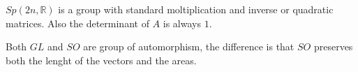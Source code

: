 \begin{Prp}
    $Sp(2n,\mathbb{R})$ is a group with standard moltiplication and inverse or quadratic matrices. Also the determinant of $A$ is always $1$.
\end{Prp}

\begin{Rmk}
    Both $GL$ and $SO$ are group of automorphism, the difference is that $SO$ preserves both the lenght of the vectors and the areas.
\end{Rmk}
